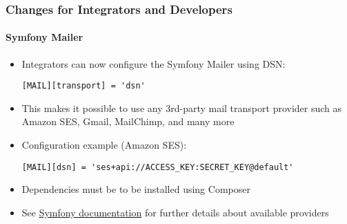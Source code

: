 %

\begin{frame}[fragile]
	\frametitle{Changes for Integrators and Developers}
	\framesubtitle{Symfony Mailer}


	\begin{itemize}
		\item Integrators can now configure the Symfony Mailer using DSN:
\begin{lstlisting}
[MAIL][transport] = 'dsn'
\end{lstlisting}
		\item This makes it possible to use any 3rd-party mail transport provider
			such as Amazon SES, Gmail, MailChimp, and many more
		\item Configuration example (Amazon SES):
\begin{lstlisting}
[MAIL][dsn] = 'ses+api://ACCESS_KEY:SECRET_KEY@default'
\end{lstlisting}

		\item Dependencies must be to be installed using Composer
		\item See \href{https://symfony.com/doc/current/mailer.html}{Symfony documentation}
			for further details about available providers
	\end{itemize}

\end{frame}

